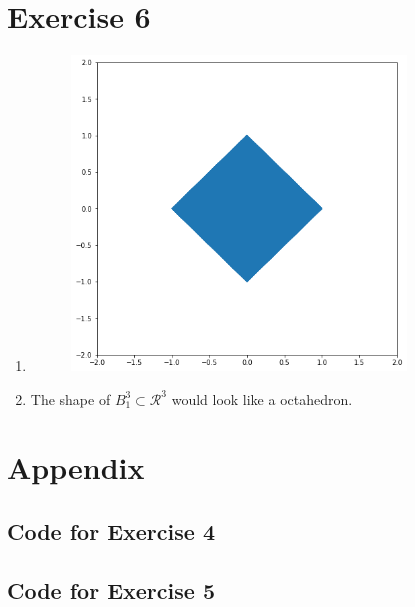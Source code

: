\documentclass[12pt]{article}
\begin{document}
\section*{Exercise 6}
\begin{enumerate}[label= (\alph*)]
    \item 
            \begin{figure}[H]
                \centering
                \includegraphics[width=3.5in]{unit_ball_plane.png}
            \end{figure}

    \item The shape of \(B^3_1 \subset \mathcal{R}^3\) would look like a octahedron.

\end{enumerate}

    

\section*{Appendix}\label{appendix}
\subsection*{Code for Exercise 4}

\subsection*{Code for Exercise 5}

\end{document}
